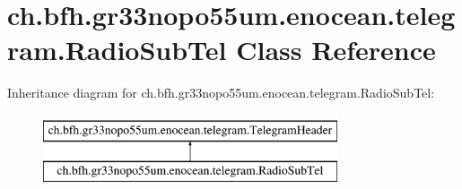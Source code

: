 \hypertarget{classch_1_1bfh_1_1gr33nopo55um_1_1enocean_1_1telegram_1_1_radio_sub_tel}{}\section{ch.\+bfh.\+gr33nopo55um.\+enocean.\+telegram.\+Radio\+Sub\+Tel Class Reference}
\label{classch_1_1bfh_1_1gr33nopo55um_1_1enocean_1_1telegram_1_1_radio_sub_tel}
Inheritance diagram for ch.\+bfh.\+gr33nopo55um.\+enocean.\+telegram.\+Radio\+Sub\+Tel\+:\begin{figure}[H]
\begin{center}
\leavevmode
\includegraphics[height=2.000000cm]{classch_1_1bfh_1_1gr33nopo55um_1_1enocean_1_1telegram_1_1_radio_sub_tel}
\end{center}
\end{figure}
